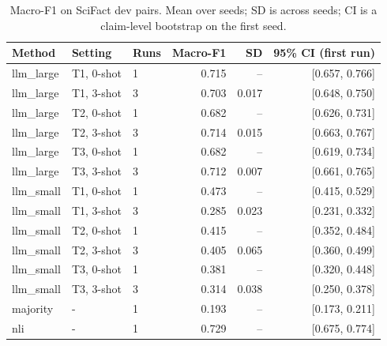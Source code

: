 \begin{table}[t]
\centering
\caption{Macro-F1 on SciFact dev pairs. Mean over seeds; SD is across seeds; CI is a claim-level bootstrap on the first seed.}
\label{tab:main}
\begin{tabular}{lllrrr}
\hline
Method & Setting & Runs & Macro-F1 & SD & 95\% CI (first run) \\
\hline
llm\_large & T1, 0-shot & 1 & 0.715 & -- & [0.657, 0.766] \\
llm\_large & T1, 3-shot & 3 & 0.703 & 0.017 & [0.648, 0.750] \\
llm\_large & T2, 0-shot & 1 & 0.682 & -- & [0.626, 0.731] \\
llm\_large & T2, 3-shot & 3 & 0.714 & 0.015 & [0.663, 0.767] \\
llm\_large & T3, 0-shot & 1 & 0.682 & -- & [0.619, 0.734] \\
llm\_large & T3, 3-shot & 3 & 0.712 & 0.007 & [0.661, 0.765] \\
llm\_small & T1, 0-shot & 1 & 0.473 & -- & [0.415, 0.529] \\
llm\_small & T1, 3-shot & 3 & 0.285 & 0.023 & [0.231, 0.332] \\
llm\_small & T2, 0-shot & 1 & 0.415 & -- & [0.352, 0.484] \\
llm\_small & T2, 3-shot & 3 & 0.405 & 0.065 & [0.360, 0.499] \\
llm\_small & T3, 0-shot & 1 & 0.381 & -- & [0.320, 0.448] \\
llm\_small & T3, 3-shot & 3 & 0.314 & 0.038 & [0.250, 0.378] \\
majority & - & 1 & 0.193 & -- & [0.173, 0.211] \\
nli & - & 1 & 0.729 & -- & [0.675, 0.774] \\
\hline
\end{tabular}
\end{table}